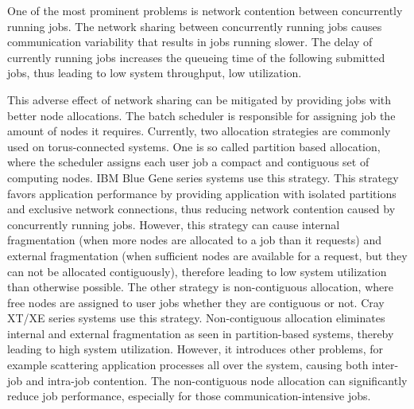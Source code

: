 \documentclass[conference]{IEEEtran}
\begin{document}

One of the most prominent  problems is network contention between concurrently running jobs. The network sharing between concurrently running jobs causes communication variability that results in jobs running slower\cite{abhinav-sc13}. The delay of currently running jobs increases the queueing time of the following submitted jobs, thus leading to low system throughput, low utilization\cite{jose-ipdps15}. 

This adverse effect of network sharing can be mitigated by providing jobs with better node allocations. The batch scheduler is responsible for assigning job the amount of nodes it requires. Currently, two allocation strategies are commonly used on torus-connected systems. One is so called partition based allocation, where the scheduler assigns each user job a compact and contiguous set of computing nodes. IBM Blue Gene series systems use this strategy. This strategy favors application performance by providing application with isolated partitions and exclusive network connections, thus reducing network contention caused by concurrently running jobs. However, this strategy can cause internal fragmentation (when more nodes are allocated to a job than it requests) and external fragmentation (when sufficient nodes are available for a request, but they can not be allocated contiguously), therefore leading to low system utilization than otherwise possible. The other strategy is non-contiguous allocation, where free nodes are assigned to user jobs whether they are contiguous or not. Cray XT/XE series systems use this strategy. Non-contiguous allocation eliminates internal and external fragmentation as seen in partition-based systems, thereby leading to high system utilization. However, it introduces other problems, for example scattering application processes all over the system, causing both inter-job and intra-job contention. The non-contiguous node allocation can significantly reduce job performance, especially for those communication-intensive jobs.
\end{document}
